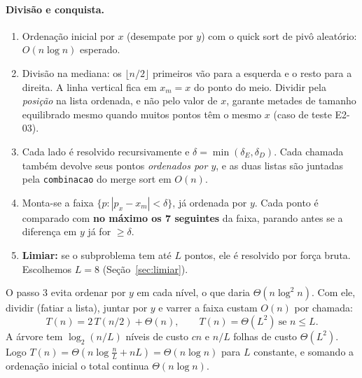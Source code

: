 \documentclass[11pt,a4paper]{article}
\begin{document}
\paragraph{Divisão e conquista.}
\begin{enumerate}
  \item Ordenação inicial por $x$ (desempate por $y$) com o quick sort de pivô aleatório: $O(n\log n)$ esperado.
  \item Divisão na mediana: os $\lfloor n/2\rfloor$ primeiros vão para a esquerda e o resto para a direita. A linha vertical fica em $x_m = x$ do ponto do meio. Dividir pela \emph{posição} na lista ordenada, e não pelo valor de $x$, garante metades de tamanho equilibrado mesmo quando muitos pontos têm o mesmo $x$ (caso de teste E2-03).
  \item Cada lado é resolvido recursivamente e $\delta=\min(\delta_E,\delta_D)$. Cada chamada também devolve seus pontos \emph{ordenados por $y$}, e as duas listas são juntadas pela \texttt{combinacao} do merge sort em $O(n)$.
  \item Monta-se a faixa $\{p : |p_x-x_m|<\delta\}$, já ordenada por $y$. Cada ponto é comparado com \textbf{no máximo os 7 seguintes} da faixa, parando antes se a diferença em $y$ já for $\ge\delta$.
  \item \textbf{Limiar:} se o subproblema tem até $L$ pontos, ele é resolvido por força bruta. Escolhemos $L=8$ (Seção~\ref{sec:limiar}).
\end{enumerate}
O passo 3 evita ordenar por $y$ em cada nível, o que daria $\Theta(n\log^2 n)$. Com ele, dividir (fatiar a lista), juntar por $y$ e varrer a faixa custam $O(n)$ por chamada:
\[
T(n) = 2\,T(n/2) + \Theta(n), \qquad T(n)=\Theta(L^2)\ \text{se } n\le L.
\]
A árvore tem $\log_2(n/L)$ níveis de custo $cn$ e $n/L$ folhas de custo $\Theta(L^2)$. Logo $T(n)=\Theta\!\left(n\log\frac{n}{L} + nL\right)=\Theta(n\log n)$ para $L$ constante, e somando a ordenação inicial o total continua $\Theta(n\log n)$.
\end{document}

